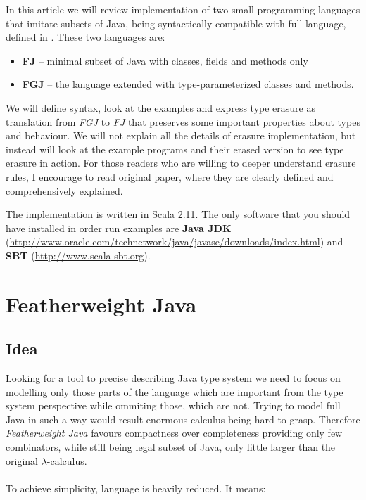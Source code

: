 \documentclass{article}[12pt]
\begin{document}
In this article we will review implementation of two small
programming languages that imitate subsets of Java, being
syntactically compatible with full language, defined in
\cite{fj}. These two languages are:

\begin{itemize}
\item{\textbf{FJ}} -- minimal subset of Java with classes,
fields and methods only
\item{\textbf{FGJ}} -- the language extended with
type-parameterized classes and methods.
\end{itemize}


We will define syntax, look at the examples and express type
erasure as translation from \emph{FGJ} to \emph{FJ} that
preserves some important properties about types and behaviour.
We will not explain all the details of erasure implementation,
but instead will look at the example programs and their erased
version to see type erasure in action. For those readers who
are willing to deeper understand erasure rules, I encourage
to read original paper, where they are clearly defined and
comprehensively explained.

The implementation is written in Scala 2.11. The only software
that you should have installed in order run examples are
\textbf{Java JDK}
(\url{http://www.oracle.com/technetwork/java/javase/downloads/index.html})
and \textbf{SBT} (\url{http://www.scala-sbt.org}).

\section{Featherweight Java}

\subsection{Idea}

Looking for a tool to precise describing Java type system we need
to focus on modelling only those parts of the language which are
important from the type system perspective while ommiting those,
which are not. Trying to model full Java in such a way would result
enormous calculus being hard to grasp. Therefore
\emph{Featherweight Java} favours compactness over completeness
providing only few combinators, while still being legal subset
of Java, only little larger than the original $\lambda$-calculus.
\\
\\
To achieve simplicity, language is heavily reduced. It means:
\end{document}
